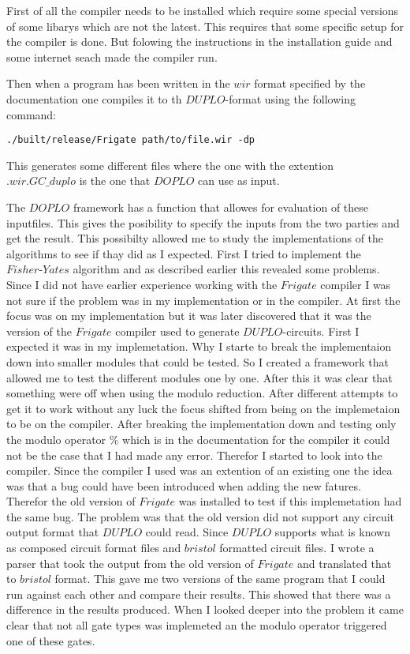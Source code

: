 First of all the compiler needs to be installed which require some special versions of some libarys which are not the latest. This requires that some specific setup for the compiler is done. But folowing the instructions in the installation guide and some internet seach made the compiler run.

Then when a program has been written in the $wir$ format specified by the documentation one compiles it to th $DUPLO$-format using the following command:

\begin{center}
\begin{verbatim}
./built/release/Frigate path/to/file.wir -dp
\end{verbatim}
\end{center}

This generates some different files where the one with the extention $.wir.GC\_duplo$ is the one that $DOPLO$ can use as input.

\bigskip

The $DOPLO$ framework has a function that allowes for evaluation of these inputfiles. This gives the posibility to specify the inputs from the two parties and get the result. This possibilty allowed me to study the implementations of the algorithms to see if thay did as I expected. First I tried to implement the $Fisher\text{-}Yates$ algorithm and as described earlier this revealed some problems. Since I did not have earlier experience working with the $Frigate$ compiler I was not sure if the problem was in my implementation or in the compiler. At first the focus was on my implementation but it was later discovered that it was the version of the $Frigate$ compiler used to generate $DUPLO$-circuits. First I expected it was in my implemetation. Why I starte to break the implementaion down into smaller modules that could be tested. So I created a framework that allowed me to test the different modules one by one. After this it was clear that something were off when using the modulo reduction. After different attempts to get it to work without any luck the focus shifted from being on the implemetaion to be on the compiler. After breaking the implementation down and testing only the modulo operator $\%$ which is in the documentation for the compiler it could not be the case that I had made any error. Therefor I started to look into the compiler. Since the compiler I used was an extention of an existing one the idea was that a bug could have been introduced when adding the new fatures. Therefor the old version of $Frigate$ was installed to test if this implemetation had the same bug. The problem was that the old version did not support any circuit output format that $DUPLO$ could read. Since $DUPLO$ supports what is known as composed circuit format files and $bristol$ formatted circuit files. I wrote a parser that took the output from the old version of $Frigate$ and translated that to $bristol$ format. This gave me two versions of the same program that I could run against each other and compare their results. This showed that there was a difference in the results produced. When I looked deeper into the problem it came clear that not all gate types was implemeted an the modulo operator triggered one of these gates.

